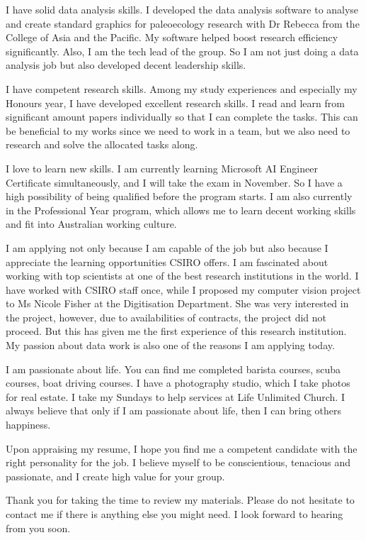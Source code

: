 \documentclass[11pt, a4paper]{awesome-cv}
\begin{document}
\begin{cvletter}
I have solid data analysis skills. I developed the data analysis software to analyse and create standard graphics for paleoecology research with Dr Rebecca from the College of Asia and the Pacific. My software helped boost research efficiency significantly. Also, I am the tech lead of the group. So I am not just doing a data analysis job but also developed decent leadership skills.

I have competent research skills. Among my study experiences and especially my Honours year, I have developed excellent research skills. I read and learn from significant amount papers individually so that I can complete the tasks. This can be beneficial to my works since we need to work in a team, but we also need to research and solve the allocated tasks along.

I love to learn new skills. I am currently learning Microsoft AI Engineer Certificate simultaneously, and I will take the exam in November. So I have a high possibility of being qualified before the program starts. I am also currently in the Professional Year program, which allows me to learn decent working skills and fit into Australian working culture.

I am applying not only because I am capable of the job but also because I appreciate the learning opportunities CSIRO offers. I am fascinated about working with top scientists at one of the best research institutions in the world. I have worked with CSIRO staff once, while I proposed my computer vision project to Ms Nicole Fisher at the Digitisation Department. She was very interested in the project, however, due to availabilities of contracts, the project did not proceed. But this has given me the first experience of this research institution. My passion about data work is also one of the reasons I am applying today.

I am passionate about life. You can find me completed barista courses, scuba courses, boat driving courses. I have a photography studio, which I take photos for real estate. I take my Sundays to help services at Life Unlimited Church. I always believe that only if I am passionate about life, then I can bring others happiness.

Upon appraising my resume, I hope you find me a competent candidate with the right personality for the job. I believe myself to be conscientious, tenacious and passionate, and I create high value for your group.

Thank you for taking the time to review my materials. Please do not hesitate to contact me if there is anything else you might need. I look forward to hearing from you soon.



\end{cvletter}
\end{document}
